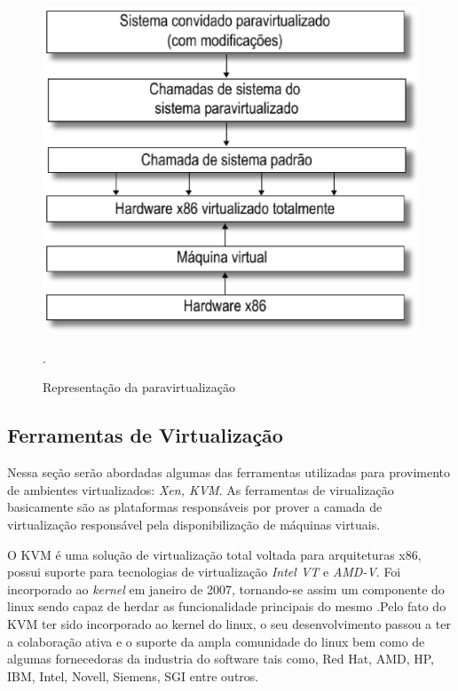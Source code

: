 \begin{figure}[!htb]
\centering
\includegraphics [keepaspectratio=true,scale=0.3]{figuras/paravirtualization.eps}
\caption{Representação da paravirtualização}
\cite{marcos}.
\label{paravirtualization}
\end{figure}

\subsection{Ferramentas de Virtualização}
Nessa seção serão abordadas algumas das ferramentas utilizadas para provimento de ambientes virtualizados: \textit{Xen, KVM}. As ferramentas de virualização basicamente são as plataformas responsáveis por prover a camada de virtualização responsável pela disponibilização de máquinas virtuais.

O KVM é uma solução de virtualização total voltada para arquiteturas x86, possui suporte para tecnologias de virtualização \textit{Intel VT} e \textit{AMD-V}. Foi incorporado ao \textit{kernel} em janeiro de 2007, tornando-se assim um componente do linux sendo capaz de herdar as funcionalidade principais do mesmo \cite{redhatkvm,qumranet}.Pelo fato do KVM ter sido incorporado ao kernel do linux, o seu desenvolvimento passou a ter a colaboração ativa e o suporte da ampla comunidade do linux bem como de algumas fornecedoras da industria do software tais como, Red Hat, AMD, HP, IBM, Intel, Novell, Siemens, SGI entre outros\cite {redhatkvm}.

